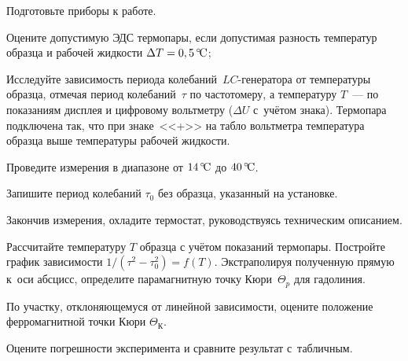 \begin{lab:task}


\item Подготовьте приборы к работе.

\item Оцените допустимую ЭДС термопары, если допустимая разность
температур образца и рабочей жидкости $\Delta T=0,5\,^\circ\!\mathrm{C}$;

		\item Исследуйте зависимость периода колебаний~$LC$-генератора от
температуры образца, отмечая период колебаний~$\tau$
		по частотомеру, а температуру $T$~--- по показаниям дисплея и цифровому
вольтметру ($\Delta U$ с~учётом знака). Термопара
		подключена так, что при знаке~<<+>> на табло вольтметра температура
образца выше температуры рабочей жидкости.

		Проведите измерения в диапазоне от $14\,^\circ\!\mathrm{C}$ до $40\,^\circ\!\mathrm{C}$.

		Запишите период колебаний $\tau_0$ без образца, указанный на установке.

		\item Закончив измерения, охладите термостат, руководствуясь техническим
описанием.



		\item Рассчитайте температуру $T$ образца с учётом показаний термопары.
Постройте график зависимости $1/(\tau^2-\tau_0^2)=f(T)$.
		Экстраполируя полученную прямую к~оси абсцисс, определите парамагнитную
точку Кюри~$\Theta_p$ для гадолиния.

        \item По участку, отклоняющемуся от линейной зависимости, оцените
        положение ферромагнитной точки Кюри $\Theta_К$.
		\item Оцените погрешности эксперимента и сравните результат с~табличным.

\end{lab:task}


